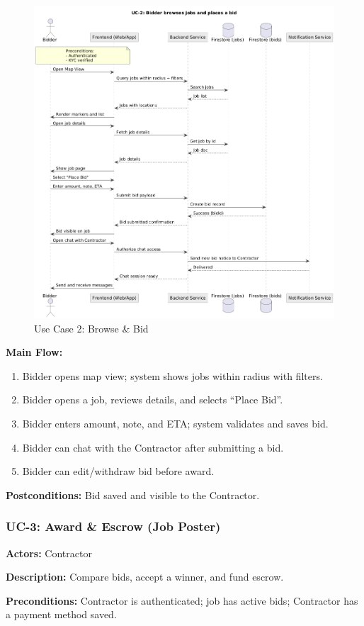 \documentclass[11pt]{article}
\begin{document}
\begin{figure}[H]
  \centering
  \includegraphics[width=0.9\linewidth]{UC-2.png}
  \caption{Use Case 2: Browse \& Bid}
  \label{fig:uc2}
\end{figure}

\textbf{Main Flow:}
\begin{enumerate}[leftmargin=1.4em]
  \item Bidder opens map view; system shows jobs within radius with filters.
  \item Bidder opens a job, reviews details, and selects ``Place Bid''.
  \item Bidder enters amount, note, and ETA; system validates and saves bid.
  \item Bidder can chat with the Contractor after submitting a bid.
  \item Bidder can edit/withdraw bid before award.
\end{enumerate}
\textbf{Postconditions:} Bid saved and visible to the Contractor.

\subsubsection*{UC-3: Award \& Escrow (Job Poster)}
\textbf{Actors:} Contractor \par
\textbf{Description:} Compare bids, accept a winner, and fund escrow.\par
\textbf{Preconditions:} Contractor is authenticated; job has active bids; Contractor has a payment method saved.\par
\end{document}
